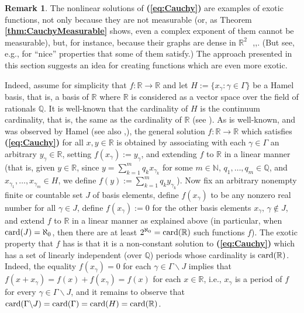 \documentclass[12 pt]{amsart}
\theoremstyle{definition}
\newtheorem{remark}[thm]{Remark}
\newcommand{\R}{\mathbb{R}}
\newcommand{\Q}{\mathbb{Q}}
\newcommand{\N}{\mathbb{N}}
\newcommand{\card}{\textnormal{card}}
\newcommand{\bref}[1]{\textbf{\ref{#1}}} %
\newcommand{\beqref}[1]{\textbf{(\ref{#1})}} %
\begin{document}
\begin{remark}\label{rem:Nonlinear}
The nonlinear solutions of \beqref{eq:Cauchy} are examples of exotic functions, not only because they are not measurable 
(or, as Theorem \bref{thm:CauchyMeasurable} shows, even a complex exponent of them cannot be measurable), but, for instance, because their graphs are dense in $\R^2\,\,$  \cite[p. 14]{AczelDhombres},\cite{Hamel},\cite{Wilansky}. (But see, e.g., \cite{Jones1942,Wilansky} for ``nice'' properties that some of them satisfy.) The approach presented in 
this section suggests an idea  for creating functions 
which are even more exotic. 

Indeed, assume for simplicity that $f:\R\to\R$ and let $H:=\{x_{\gamma}: 
 \gamma\in \Gamma\}$ be a Hamel basis, that is, a basis of $\R$ where $\R$ is considered as a vector space over the field of rationals $\Q$. It is well-known that the  cardinality of $H$ is the continuum cardinality, that is, the same as the cardinality of $\R$ (see \cite[Theorem 4.2.3, p. 82]{Kuczma2009book}). As is well-known, and was observed by Hamel \cite{Hamel} (see also \cite[pp. 35--36]{Aczel},\cite[pp. 18--19]{AczelDhombres}), the general solution $f:\R\to\R$ which satisfies \beqref{eq:Cauchy} for all $x,y\in\R$ is obtained by associating with each $\gamma\in\Gamma$ an arbitrary $y_{\gamma}\in \R$, setting  $f(x_{\gamma}):=y_{\gamma}$, and extending $f$ to $\R$ in a linear manner (that is, given $y\in \R$, since $y=\sum_{k=1}^m q_{k} x_{{\gamma}_k}$ for some $m\in\N$, $q_1,\ldots,q_m\in\Q$, and $x_{{\gamma}_1},\ldots, x_{{\gamma}_m}\in H$, we define  $f(y):=\sum_{k=1}^m q_{k} y_{{\gamma}_k}$). Now fix an arbitrary nonempty finite or countable set $J$  of basis elements, define $f(x_{\gamma})$ to be any nonzero real number for all $\gamma\in J$, define  $f(x_{\gamma}):=0$ for the other basis elements $x_{\gamma},\,\gamma\notin J$, and extend $f$ to $\R$ in a linear manner as  explained above (in particular,  when $\card(J)=\aleph_0$, then there are at least $2^{\aleph_0}=\card(\R)$ such functions $f$). The exotic property that $f$ has is that it is  a non-constant solution to  \beqref{eq:Cauchy} which has a set of  linearly independent (over $\Q$) periods whose cardinality is $\card(\R)$. Indeed, the equality $f(x_{\gamma})=0$ for each $\gamma\in \Gamma\backslash J$ implies that   $f(x+x_{\gamma})=f(x)+f(x_{\gamma})=f(x)$ for each $x\in\R$, i.e., $x_{\gamma}$ is a period of $f$ for every $\gamma\in \Gamma\backslash J$, and it remains to observe that  $\card(\Gamma\backslash J)=\card(\Gamma)=\card(H)=\card(\R)$. 


\end{remark}
\end{document}
